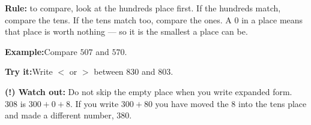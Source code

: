 \documentclass[12pt]{article}
\begin{document}
\begin{formulabox}\textbf{Rule:} to compare, look at the hundreds place first. If the
hundreds match, compare the tens. If the tens match too, compare the ones. A $0$ in a
place means that place is worth nothing --- so it is the smallest a place can be.
\end{formulabox}
\begin{examplebox}\textbf{Example:}\quad Compare $507$ and $570$.
\end{examplebox}
\begin{tryitbox}\textbf{Try it:}\quad Write $<$ or $>$ between $830$ and $803$.\\[2pt]
\end{tryitbox}

\begin{watchoutbox}\textbf{(!) Watch out:} Do not skip the empty place when you write
expanded form. $308$ is $300 + 0 + 8$. If you write $300 + 80$ you have moved the 8 into
the tens place and made a different number, $380$.
\end{watchoutbox}
\end{document}
